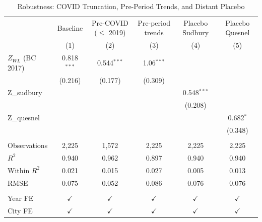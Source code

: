 
\begin{table}[htbp]
   \caption{\label{tab:angrist_checks} Robustness: COVID Truncation, Pre-Period Trends, and Distant Placebo}
   \bigskip
   \centering
   \begin{tabular}{lccccc}
      \toprule
                         & Baseline      & Pre-COVID ($\leq$ 2019)  & Pre-period trends & Placebo Sudbury & Placebo Quesnel \\   
                         & (1)           & (2)                      & (3)               & (4)             & (5)\\  
      \midrule 
      $Z_{WL}$ (BC 2017) & 0.818$^{***}$ & 0.544$^{***}$            & 1.06$^{***}$      &                 &   \\   
                         & (0.216)       & (0.177)                  & (0.309)           &                 &   \\   
      Z\_sudbury         &               &                          &                   & 0.548$^{***}$   &   \\   
                         &               &                          &                   & (0.208)         &   \\   
      Z\_quesnel         &               &                          &                   &                 & 0.682$^{*}$\\   
                         &               &                          &                   &                 & (0.348)\\   
       \\
      Observations       & 2,225         & 1,572                    & 2,225             & 2,225           & 2,225\\  
      $R^2$              & 0.940         & 0.962                    & 0.897             & 0.940           & 0.940\\  
      Within $R^2$       & 0.021         & 0.015                    & 0.027             & 0.005           & 0.013\\  
      RMSE               & 0.075         & 0.052                    & 0.086             & 0.076           & 0.076\\  
       \\
      Year FE            & $\checkmark$  & $\checkmark$             & $\checkmark$      & $\checkmark$    & $\checkmark$\\   
      City FE            & $\checkmark$  & $\checkmark$             & $\checkmark$      & $\checkmark$    & $\checkmark$\\   
      \bottomrule
   \end{tabular}
   

\end{table}
